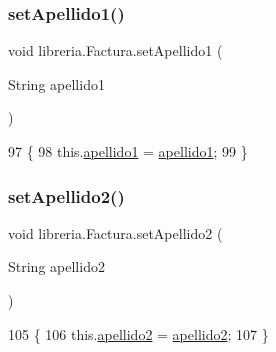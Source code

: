 \subsubsection{\texorpdfstring{set\+Apellido1()}{setApellido1()}}
{\footnotesize\ttfamily void libreria.\+Factura.\+set\+Apellido1 (\begin{DoxyParamCaption}\item[{String}]{apellido1 }\end{DoxyParamCaption})\hspace{0.3cm}{\ttfamily [inline]}}


\begin{DoxyCode}
97                                                \{
98         this.\mbox{\hyperlink{classlibreria_1_1_factura_a83e5ee3edddf7c91a71605ea4eeb9d5f}{apellido1}} = \mbox{\hyperlink{classlibreria_1_1_factura_a83e5ee3edddf7c91a71605ea4eeb9d5f}{apellido1}};
99     \}
\end{DoxyCode}
\mbox{\label{classlibreria_1_1_factura_a038d2a6661552518ce48ed8982fa2781}} 
\subsubsection{\texorpdfstring{set\+Apellido2()}{setApellido2()}}
{\footnotesize\ttfamily void libreria.\+Factura.\+set\+Apellido2 (\begin{DoxyParamCaption}\item[{String}]{apellido2 }\end{DoxyParamCaption})\hspace{0.3cm}{\ttfamily [inline]}}


\begin{DoxyCode}
105                                                \{
106         this.\mbox{\hyperlink{classlibreria_1_1_factura_af91345af6a4d1ae15efc26bd3ef29524}{apellido2}} = \mbox{\hyperlink{classlibreria_1_1_factura_af91345af6a4d1ae15efc26bd3ef29524}{apellido2}};
107     \}
\end{DoxyCode}
\mbox{\label{classlibreria_1_1_factura_a51a9e5bfa338742d674ba5a326213f13}} 
